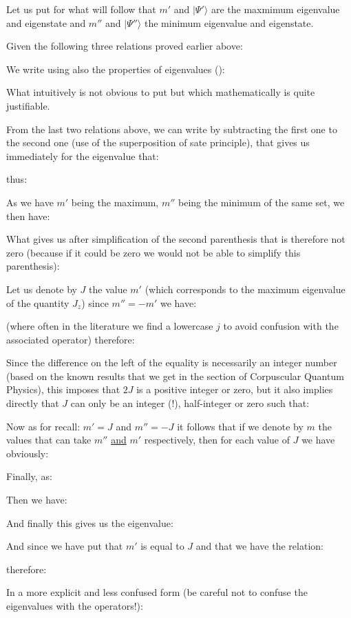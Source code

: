 	Let us put for what will follow that $m'$ and $|\Psi'\rangle$ are the maxmimum eigenvalue and eigenstate and $m''$ and $|\Psi''\rangle$ the minimum eigenvalue and eigenstate.
	
	Given the following three relations proved earlier above:
	
	We write using also the properties of eigenvalues ():
	
	What intuitively is not obvious to put but which mathematically is quite justifiable.

	From the last two relations above, we can write by subtracting the first one to the second one (use of the superposition of sate principle), that gives us immediately for the eigenvalue that:
	
	thus:
	
	As we have $m'$ being the maximum, $m''$ being the minimum of the same set, we then have:
	
	What gives us after simplification of the second parenthesis that is therefore not zero (because if it could be zero we would not be able to simplify this parenthesis):
	
	Let us denote by $J$ the value $m'$ (which corresponds to the maximum eigenvalue of the quantity $J_z$) since $m''=-m'$ we have:
	
	(where often in the literature we find a lowercase $j$ to avoid confusion with the associated operator) therefore:
	
	Since the difference on the left of the equality is necessarily an integer number (based on the known results that we get in the section of Corpuscular Quantum Physics), this imposes that $2J$ is a positive integer or zero, but it also implies directly that $J$ can only be an integer (!), half-integer or zero such that:
	
	Now as for recall: $m'=J$ and $m''=-J$ it follows that if we denote by $m$ the values that can take $m''$ \underline{and} $m'$ respectively, then for each value of $J$ we have obviously:
	
	Finally, as:
	
	Then we have:
	
	And finally this gives us the eigenvalue:
	
	And since we have put that $m'$ is equal to $J$ and that we have the relation:
	
	therefore:
	
	In a more explicit and less confused form (be careful not to confuse the eigenvalues with the operators!):
	
